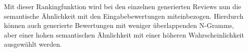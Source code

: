 Mit dieser Rankingfunktion wird bei den einzelnen generierten Reviews nun die semantische Ähnlichkeit mit den Eingabebewertungen miteinbezogen. 
Hierdurch können auch generierte Bewertungen mit weniger überlappenden N-Gramms, aber einer hohen semantischen Ähnlichkeit mit einer höheren Wahrscheinlichkeit ausgewählt werden.

\pagebreak
